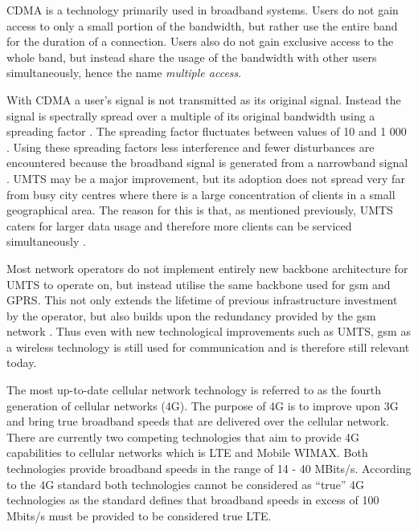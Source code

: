 \Gls{CDMA} is a technology primarily used in broadband systems\cite{GSMArchitectureProtocolsServices}. Users do not gain access to only a small portion of the bandwidth, but rather use the entire band for the duration of a connection\cite{GSMArchitectureProtocolsServices}. Users also do not gain exclusive access to the whole band, but instead share the usage of the bandwidth with other users simultaneously, hence the name \emph{multiple access}\cite{GSMArchitectureProtocolsServices}.

With \gls{CDMA} a user's signal is not transmitted as its original signal. Instead the signal is spectrally spread over a multiple of its original bandwidth using a spreading factor \cite{GSMArchitectureProtocolsServices}. The spreading factor fluctuates between values of 10 and 1 000 \cite{GSMArchitectureProtocolsServices}. Using these spreading factors less interference and fewer disturbances are encountered because the broadband signal is generated from a narrowband signal \cite{GSMArchitectureProtocolsServices}.
UMTS may be a major improvement, but its adoption does not spread very far from busy city centres where there is a large concentration of clients in a small geographical area\cite{GSMArchitectureProtocolsServices}. The reason for this is that, as mentioned previously, \gls{UMTS} caters for larger data usage and therefore more clients can be serviced simultaneously \cite{GSMArchitectureProtocolsServices}.

Most network operators do not implement entirely new backbone architecture for \gls{UMTS}\label{UMTSGSMBackbone} to operate on, but instead utilise the same backbone used for \gls{gsm} and GPRS\@\cite{GSMArchitectureProtocolsServices}. This not only extends the lifetime of previous infrastructure investment by the operator, but also builds upon the redundancy provided by the \gls{gsm} network \cite{GSMArchitectureProtocolsServices}. Thus even with new technological improvements such as \gls{UMTS}, \gls{gsm} as a wireless technology is still used for communication and is therefore still relevant today\cite{GSMArchitectureProtocolsServices}.


The most up-to-date cellular network technology is referred to as the fourth generation of cellular networks (4G)\cite{4GWirelessVid}. The purpose of 4G is to improve upon 3G and bring true broadband speeds that are delivered over the cellular network\cite{4GWirelessVid}. There are currently two competing technologies that aim to provide 4G capabilities to cellular networks which is \gls{LTE} and Mobile \gls{WIMAX}\cite{4GWirelessVid}. Both technologies provide broadband speeds in the range of 14 - 40 MBits/s\cite{4GWirelessVid}. According to the 4G standard both technologies cannot be considered as ``true'' 4G technologies as the standard defines that broadband speeds in excess of 100 Mbits/s must be provided to be considered true \gls{LTE}\cite{4GWirelessVid}.

